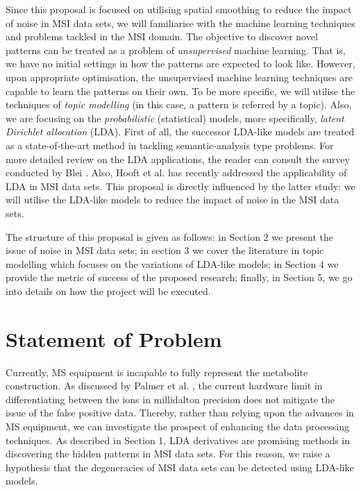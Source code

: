 \documentclass{mprop}
\begin{document}
\par Since this proposal is focused on utilising spatial smoothing to reduce the impact of noise in MSI data sets, we will familiarise with the machine learning techniques and problems tackled in the MSI domain. The objective to discover novel patterns can be treated as a problem of \textit{unsupervised} machine learning. That is, we have no initial settings in how the patterns are expected to look like. However, upon appropriate optimisation, the unsupervised machine learning techniques are capable to learn the patterns on their own. To be more specific, we will utilise the techniques of \textit{topic modelling} (in this case, a pattern is referred by a topic). Also, we are focusing on the \textit{probabilistic} (statistical) models, more specifically, \textit{latent Dirichlet allocation} (LDA). First of all, the successor LDA-like models are treated as a state-of-the-art method in tackling semantic-analysis type problems. For more detailed review on the LDA applications, the reader can consult the survey conducted by Blei \cite{blei_2012}. Also, Hooft et al. \cite{hooft} has recently addressed the applicability of LDA in MSI data sets. This proposal is directly influenced by the latter study: we will utilise the LDA-like models to reduce the impact of noise in the MSI data sets.  

\par The structure of this proposal is given as follows: in Section 2 we present the issue of noise in MSI data sets; in section 3 we cover the literature in topic modelling which focuses on the variations of LDA-like models; in Section 4 we provide the metric of success of the proposed research; finally, in Section 5, we go into details on how the project will be executed.

\section{Statement of Problem}

\par Currently, MS equipment is incapable to fully represent the metabolite construction. As discussed by Palmer et al. \cite{palmer},  the current hardware limit in differentiating between the ions in millidalton precision does not mitigate the issue of the false positive data. Thereby, rather than relying upon the advances in MS equipment, we can investigate the prospect of enhancing the data processing techniques. As described in Section 1, LDA derivatives are promising methods in discovering the hidden patterns in MSI data sets. For this reason, we raise a hypothesis that the degeneracies of MSI data sets can be detected using LDA-like models.   
\end{document}
